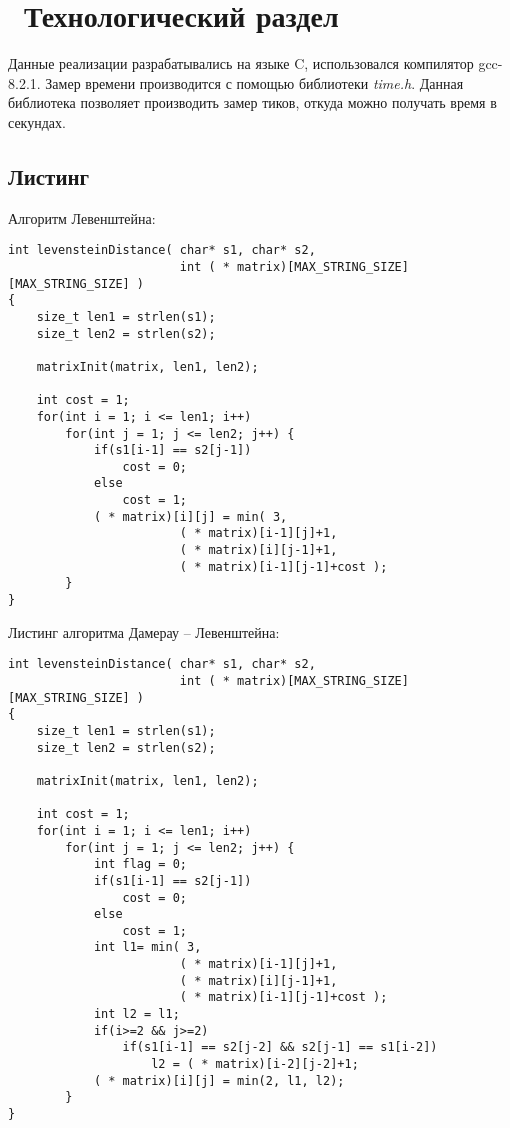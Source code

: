 \chapter{ Технологический раздел}
\label{cha:impl}
Данные реализации разрабатывались на языке C, использовался компилятор gcc-8.2.1.
Замер времени производится с помощью библиотеки \textit{time.h}. Данная библиотека позволяет производить замер тиков, откуда можно получать время в секундах. 

\section{ Листинг}
Алгоритм Левенштейна: 
\begin{lstlisting}[style=CStyle]
int levensteinDistance( char* s1, char* s2,
                        int ( * matrix)[MAX_STRING_SIZE][MAX_STRING_SIZE] )
{
    size_t len1 = strlen(s1);
    size_t len2 = strlen(s2);

    matrixInit(matrix, len1, len2);

    int cost = 1;
    for(int i = 1; i <= len1; i++)
        for(int j = 1; j <= len2; j++) {
            if(s1[i-1] == s2[j-1])
                cost = 0;
            else
                cost = 1;
            ( * matrix)[i][j] = min( 3,
                        ( * matrix)[i-1][j]+1,
                        ( * matrix)[i][j-1]+1,
                        ( * matrix)[i-1][j-1]+cost );
        }
}
\end{lstlisting}

Листинг алгоритма Дамерау -- Левенштейна:
\begin{lstlisting}[style=CStyle]
int levensteinDistance( char* s1, char* s2,
                        int ( * matrix)[MAX_STRING_SIZE][MAX_STRING_SIZE] )
{
    size_t len1 = strlen(s1);
    size_t len2 = strlen(s2);

    matrixInit(matrix, len1, len2);

    int cost = 1;
    for(int i = 1; i <= len1; i++)
        for(int j = 1; j <= len2; j++) {
            int flag = 0;
            if(s1[i-1] == s2[j-1])
                cost = 0;
            else
                cost = 1;
            int l1= min( 3,
                        ( * matrix)[i-1][j]+1,
                        ( * matrix)[i][j-1]+1,
                        ( * matrix)[i-1][j-1]+cost );
            int l2 = l1;
            if(i>=2 && j>=2)
                if(s1[i-1] == s2[j-2] && s2[j-1] == s1[i-2])
                    l2 = ( * matrix)[i-2][j-2]+1;
            ( * matrix)[i][j] = min(2, l1, l2);
        }
}
\end{lstlisting}

